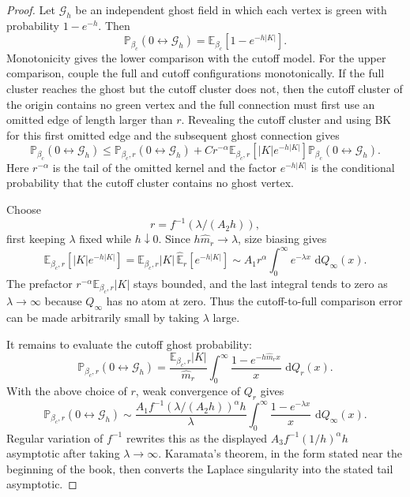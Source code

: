 \documentclass[11pt,reqno]{book}
\numberwithin{equation}{chapter}
\theoremstyle{plain}
\theoremstyle{definition}
\theoremstyle{remark}
\newcommand{\1}{\mathbf 1}
\newcommand{\dd}{\,\mathrm d}
\begin{document}
\begin{proof}
Let \(\mathcal G_h\) be an independent ghost field in which each vertex is
green with probability \(1-e^{-h}\). Then
\[
  \mathbb P_{\beta_c}(0\leftrightarrow \mathcal G_h)
  =
  \mathbb E_{\beta_c}\left[1-e^{-h|K|}\right].
\]
Monotonicity gives the lower comparison with the cutoff model. For the upper
comparison, couple the full and cutoff configurations monotonically. If the
full cluster reaches the ghost but the cutoff cluster does not, then the
cutoff cluster of the origin contains no green vertex and the full connection
must first use an omitted edge of length larger than \(r\). Revealing the
cutoff cluster and using BK for this first omitted edge and the subsequent
ghost connection gives
\[
  \mathbb P_{\beta_c}(0\leftrightarrow \mathcal G_h)
  \leq
  \mathbb P_{\beta_c,r}(0\leftrightarrow \mathcal G_h)
  +
  C r^{-\alpha}
  \mathbb E_{\beta_c,r}[|K|e^{-h|K|}]
  \mathbb P_{\beta_c}(0\leftrightarrow \mathcal G_h).
\]
Here \(r^{-\alpha}\) is the tail of the omitted kernel and the factor
\(e^{-h|K|}\) is the conditional probability that the cutoff cluster contains
no ghost vertex.

Choose
\[
  r=f^{-1}(\lambda/(A_2h)),
\]
first keeping \(\lambda\) fixed while \(h\downarrow0\). Since
\(h\widehat m_r\to\lambda\), size biasing gives
\[
  \mathbb E_{\beta_c,r}[|K|e^{-h|K|}]
  =
  \mathbb E_{\beta_c,r}|K|\,
  \widehat{\mathbb E}_r[e^{-h|K|}]
  \sim
  A_1r^\alpha
  \int_0^\infty e^{-\lambda x}\,\dd Q_\infty(x).
\]
The prefactor \(r^{-\alpha}\mathbb E_{\beta_c,r}|K|\) stays bounded, and the
last integral tends to zero as \(\lambda\to\infty\) because \(Q_\infty\) has
no atom at zero. Thus the cutoff-to-full comparison error can be made
arbitrarily small by taking \(\lambda\) large.

It remains to evaluate the cutoff ghost probability:
\[
  \mathbb P_{\beta_c,r}(0\leftrightarrow\mathcal G_h)
  =
  \frac{\mathbb E_{\beta_c,r}|K|}{\widehat m_r}
  \int_0^\infty
  \frac{1-e^{-h\widehat m_r x}}{x}\,\dd Q_r(x).
\]
With the above choice of \(r\), weak convergence of \(Q_r\) gives
\[
  \mathbb P_{\beta_c,r}(0\leftrightarrow\mathcal G_h)
  \sim
  \frac{A_1 f^{-1}(\lambda/(A_2h))^\alpha h}{\lambda}
  \int_0^\infty
  \frac{1-e^{-\lambda x}}{x}\,\dd Q_\infty(x).
\]
Regular variation of \(f^{-1}\) rewrites this as the displayed
\(A_3 f^{-1}(1/h)^\alpha h\) asymptotic after taking
\(\lambda\to\infty\). Karamata's theorem, in the form stated near the
beginning of the book, then converts the Laplace singularity into the stated
tail asymptotic.
\end{proof}
\end{document}
